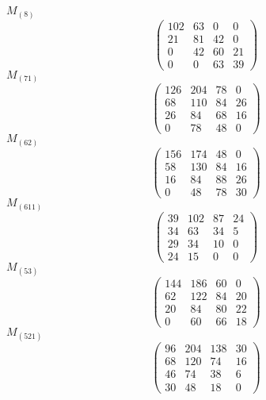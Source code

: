 \documentclass[12pt,reqno]{amsart}
\begin{document}
\Large
$M_{(8)}$                             $$ \begin{pmatrix} 
                         102 & 63 & 0 & 0 \\[6pt]
                         21 & 81 & 42 & 0 \\[6pt]
                         0 & 42 & 60 & 21 \\[6pt]
                            0 & 0 & 63 & 39
                              \end{pmatrix} $$ 
$M_{(71)}$                             $$ \begin{pmatrix} 
                        126 & 204 & 78 & 0 \\[6pt]
                        68 & 110 & 84 & 26 \\[6pt]
                         26 & 84 & 68 & 16 \\[6pt]
                            0 & 78 & 48 & 0
                              \end{pmatrix} $$ 
$M_{(62)}$                             $$ \begin{pmatrix} 
                        156 & 174 & 48 & 0 \\[6pt]
                        58 & 130 & 84 & 16 \\[6pt]
                         16 & 84 & 88 & 26 \\[6pt]
                           0 & 48 & 78 & 30
                              \end{pmatrix} $$ 
$M_{(611)}$                             $$ \begin{pmatrix} 
                        39 & 102 & 87 & 24 \\[6pt]
                         34 & 63 & 34 & 5 \\[6pt]
                         29 & 34 & 10 & 0 \\[6pt]
                            24 & 15 & 0 & 0
                              \end{pmatrix} $$ 
$M_{(53)}$                             $$ \begin{pmatrix} 
                        144 & 186 & 60 & 0 \\[6pt]
                        62 & 122 & 84 & 20 \\[6pt]
                         20 & 84 & 80 & 22 \\[6pt]
                           0 & 60 & 66 & 18
                              \end{pmatrix} $$ 
$M_{(521)}$                             $$ \begin{pmatrix} 
                        96 & 204 & 138 & 30 \\[6pt]
                        68 & 120 & 74 & 16 \\[6pt]
                         46 & 74 & 38 & 6 \\[6pt]
                           30 & 48 & 18 & 0
                              \end{pmatrix} $$ 
\end{document}

